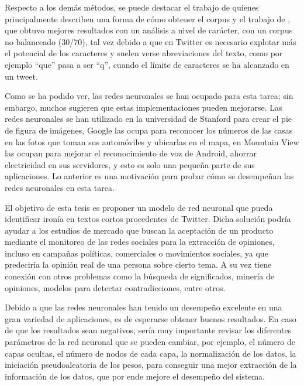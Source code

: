 \par Respecto a los demás métodos, se puede destacar el trabajo de \textcite{reyes2012making} quienes principalmente describen una forma de cómo obtener el corpus y el trabajo de  \textcite{lopez2016character}, que obtuvo mejores resultados con un análisis a nivel de carácter, con un corpus no balanceado (30/70), tal vez debido a que en Twitter es necesario explotar más el potencial de los caracteres y suelen verse abreviaciones del texto, como por ejemplo  ``que'' pasa a ser ``q'', cuando el límite de caracteres se ha alcanzado en un tweet.

\par Como se ha podido ver, las redes neuronales se han ocupado para esta tarea; sin embargo, muchos sugieren que estas implementaciones pueden mejorarse. Las redes neuronales se han utilizado en la universidad de Stanford para crear el pie de figura de imágenes, Google las ocupa para reconocer los números de las casas en las fotos que toman sus automóviles y ubicarlas en el mapa, en Mountain View las ocupan para mejorar el reconocimiento de voz de  Android, ahorrar electricidad en sus servidores, y esto es solo una pequeña parte de sus aplicaciones. Lo anterior es una motivación para probar cómo se desempeñan las redes neuronales en esta tarea. 

\par El objetivo de esta tesis es proponer un modelo de red neuronal que pueda identificar ironía en textos cortos procedentes de Twitter. Dicha solución podría ayudar a los estudios de mercado que buscan la aceptación de un producto mediante el monitoreo de las redes sociales para la extracción de opiniones, incluso en campañas políticas, comerciales o movimientos sociales, ya que predeciría la opinión real de una persona sobre cierto tema. A su vez tiene conexión con otros problemas como la búsqueda de significados, minería de opiniones, modelos para detectar contradicciones, entre otros.


\par Debido a que las redes neuronales han tenido un desempeño excelente en una gran variedad de aplicaciones, es de esperarse obtener buenos resultados. En caso de que los resultados sean negativos, sería muy importante revisar los diferentes parámetros de la red neuronal que se pueden cambiar, por ejemplo, el número de capas ocultas, el número de nodos de cada capa, la normalización de los datos, la iniciación pseudoaleatoria de los pesos, para conseguir una mejor extracción de la información de los datos, que por ende mejore el desempeño del sistema.


